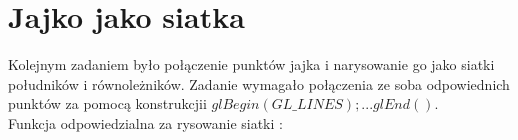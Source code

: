 \documentclass[wide,a4paper,titlepage,12pt] {article}
\begin{document}
\section{Jajko jako siatka}
Kolejnym zadaniem było połączenie punktów jajka i narysowanie go jako siatki południków i równoleżników. Zadanie wymagało połączenia ze soba odpowiednich punktów za pomocą konstrukcjii $glBegin(GL\_LINES); ... glEnd()$.\\
Funkcja odpowiedzialna za rysowanie siatki : \\
\lstset{ %
    language=c++,                %
    basicstyle=\scriptsize,       %
    numbers=left,                   %
    numberstyle=\scriptsize,      %
    stepnumber=10,                   %
    numbersep=9pt,                  %
    showspaces=false,               %
    showstringspaces=false,         %
    showtabs=false,                 %
    breaklines=true,                %
    }
    
\end{document}
